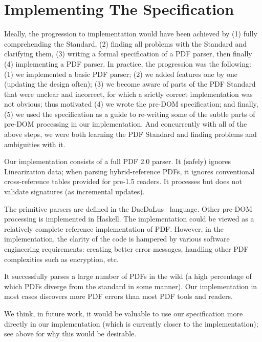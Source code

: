 \section{Implementing The Specification}
\label{sec:implementation}

Ideally, the progression to implementation would have been achieved by
%
(1) fully comprehending the Standard,
(2) finding all problems with the Standard and clarifying them,
(3) writing a formal specification of a PDF parser,
then finally (4) implementing a PDF parser.
%
In practice, the progression was the following:
%
(1) we implemented a basic PDF parser;
(2) we added features one by one (updating the design often);
(3) we become aware of parts of the PDF Standard that were unclear and
incorrect, for which a srictly correct implementation was not obvious;
thus motivated
(4) we wrote the pre-DOM specification; and finally,
(5) we used the specification as a guide to re-writing some of
the subtle parts of pre-DOM processing in our implementation.
%
And concurrently with all of the above steps, we were both learning the PDF
Standard and finding problems and ambiguities with it.

Our implementation consists of a full PDF 2.0 parser.  It (safely) ignores
Linearization data;
%
when parsing hybrid-reference PDFs, it ignores conventional
cross-reference tables provided for pre-1.5 readers.
%
It processes but does not validate signatures (as incremental
updates).

The primitive parsers are defined in the DaeDaLus~\cite{daedalusrepo}
language.
%
Other pre-DOM processing is implemented in Haskell.
%
The implementation could be viewed as a relatively complete reference 
implementation of PDF.
However, in the implementation, 
the clarity of the code is hampered by various software engineering
requirements:
creating better error messages,
handling other PDF complexities such as encryption,
etc.

It successfully parses a large number of PDFs in the wild
(a high percentage of which PDFs diverge from the standard in some manner).
Our implementation in most cases discovers more PDF errors than
most PDF tools and readers.

We think, in future work, it would be valuable to use our specification more
directly in our implementation (which is currently closer to the \dsp{}
implementation);
%
see  above for why this would be
desirable.


